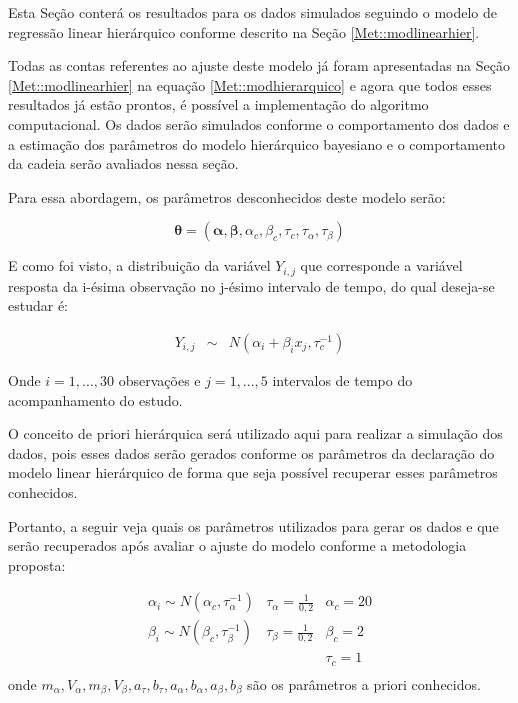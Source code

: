 \documentclass[12pt,a4paper,header]{abnt}
\def\bs{\boldsymbol}
\begin{document}
Esta Seção conterá os resultados para os dados simulados seguindo o modelo de regressão linear hierárquico conforme descrito na Seção \ref{Met::modlinearhier}.

Todas as contas referentes ao ajuste deste modelo já foram apresentadas na Seção \ref{Met::modlinearhier} na equação \ref{Met::modhierarquico} e agora que todos esses resultados já estão prontos, é possível a implementação do algoritmo computacional. Os dados serão simulados conforme o comportamento dos dados e a estimação dos parâmetros do modelo hierárquico bayesiano e o comportamento da cadeia serão avaliados nessa seção.

Para essa abordagem, os parâmetros desconhecidos deste modelo serão:

$$
\bs{\theta}=({\bs{\alpha},\bs{\beta}, \alpha_c, \beta_c, \tau_c, \tau_\alpha, \tau_\beta})
$$

E como foi visto, a distribuição da variável $Y_{i,j}$ que corresponde a variável resposta da i-ésima observação no j-ésimo intervalo de tempo, do qual deseja-se estudar é:

\begin{eqnarray}
Y_{i,j} & \sim & N( \alpha_i +\beta_i x_j , \tau_c^{-1})
\end{eqnarray}

Onde $i=1,...,30$ observações e $j=1,...,5$ intervalos de tempo do acompanhamento do estudo.


O conceito de priori hierárquica será utilizado aqui para realizar a simulação dos dados, pois esses dados serão gerados conforme os parâmetros da declaração do modelo linear hierárquico de forma que seja possível recuperar esses parâmetros conhecidos.

Portanto, a seguir veja quais os parâmetros utilizados para gerar os dados e que serão recuperados após avaliar o ajuste do modelo conforme a metodologia proposta:

\begin{eqnarray}
\alpha_{i}  \sim  N( \alpha_c , \tau_\alpha^{-1}) &  \tau_\alpha  = \frac{1}{0,2}  & \alpha_{c}  = 20   \nonumber \\
\beta_{i}  \sim  N( \beta_c , \tau_\beta^{-1})    &\tau_\beta  = \frac{1}{0,2} & \beta_{c}  = 2    \label{priorisMLH} \\
  &  & \tau_c  = 1 \nonumber \\
\end{eqnarray}
onde $m_\alpha, V_\alpha, m_\beta, V_\beta, a_\tau, b_\tau, a_\alpha, b_\alpha, a_\beta, b_\beta$ são os parâmetros a priori conhecidos.
\end{document}
